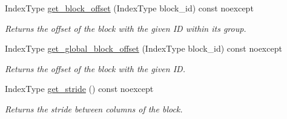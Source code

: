 \begin{DoxyCompactItemize}
Index\+Type \hyperlink{structgko_1_1preconditioner_1_1block__interleaved__storage__scheme_a6384280dc1ad46fc1589d0b9165fd022}{get\+\_\+block\+\_\+offset} (Index\+Type block\+\_\+id) const noexcept
\begin{DoxyCompactList}\small\item\em Returns the offset of the block with the given ID within its group. \end{DoxyCompactList}\item 
Index\+Type \hyperlink{structgko_1_1preconditioner_1_1block__interleaved__storage__scheme_ad8356b187814609c7d77bd03e025c48f}{get\+\_\+global\+\_\+block\+\_\+offset} (Index\+Type block\+\_\+id) const noexcept
\begin{DoxyCompactList}\small\item\em Returns the offset of the block with the given ID. \end{DoxyCompactList}\item 
Index\+Type \hyperlink{structgko_1_1preconditioner_1_1block__interleaved__storage__scheme_aa07119fbf99fae71b1f9c4f693e14ce4}{get\+\_\+stride} () const noexcept
\begin{DoxyCompactList}\small\item\em Returns the stride between columns of the block. \end{DoxyCompactList}\end{DoxyCompactItemize}
